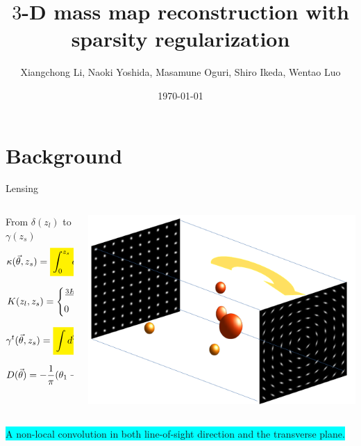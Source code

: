 \documentclass[10pt]{beamer}
\title{$3$-D mass map reconstruction with sparsity regularization}
\subtitle{}
\date{\today}
\author{
Xiangchong Li, Naoki Yoshida, Masamune Oguri,
Shiro Ikeda, Wentao Luo
\\ }
\institute{Department of Physics, University of Tokyo }
\newcommand{\mathcolorbox}[2]{\colorbox{#1}{$\displaystyle #2$}}
\begin{document}
\maketitle



\section{Background}
\begin{frame}{Lensing}
\begin{columns}
\begin{column}{0.5\textwidth}
\begin{alertblock}{From $\delta(z_l)$ to $\gamma(z_s)$}
\begin{equation}\notag
\kappa(\vec{\theta},z_s)= \mathcolorbox{yellow}{\int_0^{z_s} dz_l K(z_l,z_s)}\delta(\vec{\theta},z_l).
\end{equation}

\begin{equation}\notag
K(z_l,z_s) =
\begin{cases}
\frac{3H_0\Omega_M}{2 c} \frac{\chi_l \chi_{sl} (1+z_l)}{\chi_{s} E\left(z_l\right)} & (z_s>z_l),\\
0&(else).
\end{cases}
\end{equation}

\begin{equation}\notag
\gamma^t(\vec{\theta},z_s) = \mathcolorbox{yellow}{\int d^2 \theta' D(\vec{\theta}-\vec{\theta'})} \kappa(\vec{\theta'},z_s) ,
\end{equation}

\begin{equation}\notag
D(\vec{\theta})=-\frac{1}{\pi}(\theta_1-i\theta_2)^{-2}.
\end{equation}

\end{alertblock}
\end{column}
\begin{column}{0.7\textwidth}
\centering
\includegraphics[height=.6\textwidth]{weak_lensing_shear_deom.png}
\end{column}
\end{columns}
\colorbox{cyan}{\small A non-local convolution in both line-of-sight direction and the transverse plane.}
\end{frame}
\end{document}
